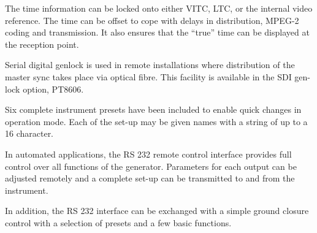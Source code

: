 The time information can be locked onto either VITC, LTC, or the internal video reference. The time can be offset to cope with delays in distribution, MPEG-2 coding and transmission. It also ensures that the ``true'' time can be displayed at the reception point.

Serial digital genlock is used in remote installations where distribution of the master sync takes place via optical fibre. This facility is available in the SDI gen-lock option, PT8606.

Six complete instrument presets have been included to enable quick changes in operation mode. Each of the set-up may be given names with a string of up to a 16 character.

In automated applications, the RS 232 remote control interface provides full control over all functions of the generator. Parameters for each output can be adjusted remotely and a complete set-up can be transmitted to and from the instrument.

In addition, the RS 232 interface can be exchanged with a simple ground closure control with a selection of presets and a few basic functions.
